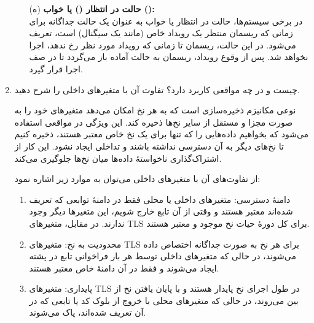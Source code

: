 \begin{enumerate}
	
	\begin{qsolve}
		\begin{enumerate}
			\item [(ه)]
			\textbf{حالت در انتظار () یا خواب ():}\\
			در برخی سیستم‌ها، حالت در انتظار یا خواب به عنوان یک حالت جداگانه برای زمانی که ریسمان منتظر یک رویداد خاص (مانند یک سیگنال) است، تعریف می‌شود.
			در این حالت، ریسمان تا زمانی که رویداد مورد نظر رخ ندهد، اجرا نخواهد شد.
			پس از وقوع رویداد، ریسمان به حالت آماده باز می‌گردد تا در صف اجرا قرار گیرد.
		\end{enumerate}
	\end{qsolve}
	
	
	\item 
	  چیست و در چه مواقعی کاربرد دارد؟ تفاوت آن با متغیرهای داخلی را شرح دهید.
	
	\begin{qsolve}
		 نوعی مکانیزم ذخیره‌سازی است که به هر نخ امکان می‌دهد متغیرهای خود را به صورت مجزا و مستقل از سایر نخ‌ها ذخیره کند. این ویژگی در مواقعی استفاده می‌شود که بخواهیم داده‌هایی را که تنها برای یک نخ خاص معتبر هستند، ذخیره کنیم تا نخ‌های دیگر به آن دسترسی نداشته باشند و تداخلی ایجاد نشود. این کار از اشتراک‌گذاری ناخواستهٔ داده‌ها میان نخ‌ها جلوگیری می‌کند.
	
	
	از تفاوت‌های آن با متغیرهای داخلی می‌توان به موارد زیر اشاره نمود:
	
	\begin{enumerate}
		\item 
		دامنهٔ دسترسی: متغیرهای داخلی یا محلی فقط در دامنهٔ توابعی که تعریف شده‌اند معتبر هستند و وقتی از آن تابع خارج شویم، این متغیرها دیگر وجود ندارند. در مقابل، متغیرهای TLS برای کل دورهٔ حیات نخ موجود و معتبر هستند.
		
		\item 
		محدودیت به نخ: متغیرهای TLS برای هر نخ به صورت جداگانه اختصاص داده می‌شوند، در حالی که متغیرهای داخلی توسط هر بار فراخوانی تابع در پشته ایجاد می‌شوند و فقط در آن دامنهٔ خاص معتبر هستند.
		
		\item 
		پایداری: متغیرهای TLS در طول اجرای نخ پایدار هستند و با پایان یافتن نخ از بین می‌روند، در حالی که متغیرهای محلی با خروج از بلوک کد یا تابعی که در آن تعریف شده‌اند، پاک می‌شوند.
	\end{enumerate}
	
	\end{qsolve}
	

\end{enumerate}
